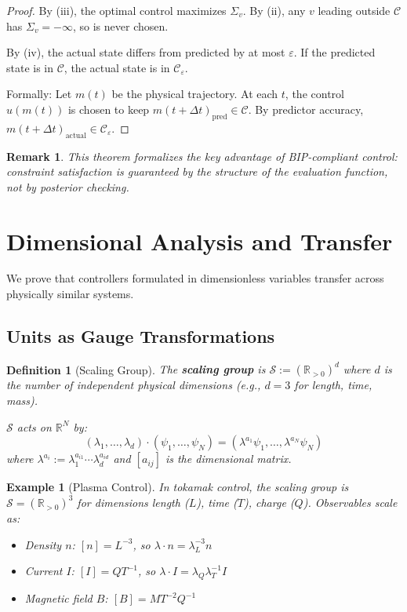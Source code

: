 \documentclass[11pt]{article}
\newtheorem{definition}[theorem]{Definition}
\newtheorem{example}[theorem]{Example}
\newtheorem{remark}[theorem]{Remark}
\begin{document}
\begin{proof}
By (iii), the optimal control maximizes $\Sigma_v$. By (ii), any $v$ leading outside $\mathcal{C}$ has $\Sigma_v = -\infty$,
so is never chosen.

By (iv), the actual state differs from predicted by at most $\varepsilon$. If the predicted state is in $\mathcal{C}$,
the actual state is in $\mathcal{C}_\varepsilon$.

Formally: Let $m(t)$ be the physical trajectory. At each $t$, the control $u(m(t))$ is chosen to
keep $m(t + \Delta t)_{\mathrm{pred}} \in \mathcal{C}$. By predictor accuracy, $m(t + \Delta t)_{\mathrm{actual}} \in \mathcal{C}_\varepsilon$.
\end{proof}

\begin{remark}
This theorem formalizes the key advantage of BIP-compliant control: constraint
satisfaction is guaranteed by the structure of the evaluation function, not by posterior checking.
\end{remark}

\section{Dimensional Analysis and Transfer}

We prove that controllers formulated in dimensionless variables transfer across physically similar
systems.

\subsection{Units as Gauge Transformations}

\begin{definition}[Scaling Group]
The \textbf{scaling group} is $\mathcal{S} := (\mathbb{R}_{>0})^d$ where $d$ is the number of
independent physical dimensions (e.g., $d = 3$ for length, time, mass).

$\mathcal{S}$ acts on $\mathbb{R}^N$ by:
\[
(\lambda_1, \ldots, \lambda_d) \cdot (\psi_1, \ldots, \psi_N) = (\lambda^{a_1}\psi_1, \ldots, \lambda^{a_N}\psi_N)
\]
where $\lambda^{a_i} := \lambda_1^{a_{i1}} \cdots \lambda_d^{a_{id}}$ and $[a_{ij}]$ is the dimensional matrix.
\end{definition}

\begin{example}[Plasma Control]
In tokamak control, the scaling group is $\mathcal{S} = (\mathbb{R}_{>0})^3$ for
dimensions length ($L$), time ($T$), charge ($Q$). Observables scale as:
\begin{itemize}
    \item Density $n$: $[n] = L^{-3}$, so $\lambda \cdot n = \lambda_L^{-3} n$
    \item Current $I$: $[I] = QT^{-1}$, so $\lambda \cdot I = \lambda_Q \lambda_T^{-1} I$
    \item Magnetic field $B$: $[B] = MT^{-2}Q^{-1}$
\end{itemize}
\end{example}
\end{document}
